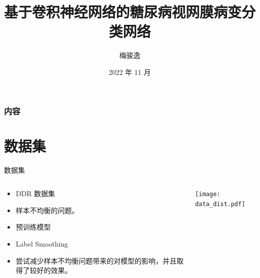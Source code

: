 \documentclass[9pt, aspectratio=1610]{beamer}
\title[基于卷积神经网络的糖尿病视网膜病变分类网络]{基于卷积神经网络的糖尿病视网膜病变分类网络}
\author[梅骏逸]{梅骏逸\quad 2111876}
\institute[]{网络空间安全学院\quad 信息安全、法学}
\date[2022 年 11 月]{2022 年 11 月}
\begin{document}
\frame{\titlepage}
\begin{frame}
\frametitle{内容}
\tableofcontents
\end{frame}
\section{数据集}
    \begin{frame}{数据集}
    \begin{columns}
        \begin{column}{0.5\textwidth}
            \begin{itemize}
                \item DDR 数据集\cite{LI2019}
                \item 样本不均衡的问题。
                \item 预训练模型
                \item Label Smoothing
                \item 尝试减少样本不均衡问题带来的对模型的影响，并且取得了较好的效果。
            \end{itemize}
        \end{column}
        \begin{column}{0.5\textwidth}
            \centering
            \texttt{[image: data\_dist.pdf]}
        \end{column}
    \end{columns}


    \end{frame}
\end{document}
